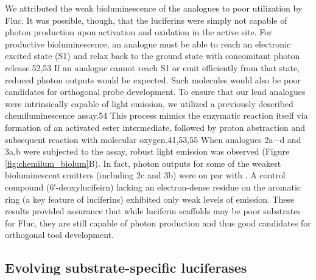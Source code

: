 We attributed the weak bioluminescence of the
analogues to poor utilization by Fluc. It was possible, though,
that the luciferins were simply not capable of photon
production upon activation and oxidation in the active site.
For productive bioluminescence, an analogue must be able to
reach an electronic excited state (S1) and relax back to the
ground state with concomitant photon release.52,53 If an
analogue cannot reach S1 or emit efficiently from that state,
reduced photon outputs would be expected. Such molecules
would also be poor candidates for orthogonal probe development.
To ensure that our lead analogues were intrinsically
capable of light emission, we utilized a previously described
chemiluminescence assay.54 This process mimics the enzymatic
reaction itself via formation of an activated ester intermediate,
followed by proton abstraction and subsequent reaction with
molecular oxygen.41,53,55 When analogues 2a−d and 3a,b were
subjected to the assay, robust light emission was observed
(Figure \ref{fig:chemilum_biolum}B). In fact, photon outputs for some of the weakest
bioluminescent emitters (including 2c and 3b) were on par
with \dluciferin{}. A control compound (6′-deoxylucifeirn)
lacking an electron-dense residue on the aromatic ring (a key
feature of luciferins) exhibited only weak levels of emission.
These results provided assurance that while luciferin scaffolds
may be poor substrates for Fluc, they are still capable of photon
production and thus good candidates for orthogonal tool
development.

\subsection*{Evolving substrate-specific luciferases}

